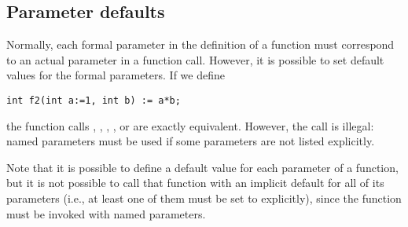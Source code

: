 \subsection{Parameter defaults}

Normally, each formal parameter in the definition of a function must
correspond to an actual parameter in a function call.
However, it is possible to set default values for the formal parameters.
If we define
\begin{lstlisting}
int f2(int a:=1, int b) := a*b;
\end{lstlisting}
the function calls , ,
, , or  are
exactly equivalent.
However, the call  is illegal: named
parameters must be used if some parameters are not listed explicitly.

Note that it is possible to define a default value for each parameter
of a function, but it is not possible to call that function with an
implicit default for all of its parameters
(i.e., at least one of them must be set to  explicitly),
since the function must be invoked with named parameters.

\begin{comment}
\subsection{A parallelizable \Code{for} statement}

The \Code{for} statement is a natural candidate for parallelization.
Indeed, {\smart} can recognize parallelism and perform
the concurrent computation of all the values specified in a \Code{for}
statement, provided no dependencies from one ``iteration'' to the next exist,

For example, the 100 values
\begin{lstlisting}
for (int i in {0..9}, int j in {0..9}) {
  int measure[i][j] := mymodel(i,j);
}
\end{lstlisting}
can be computed concurrently,
This reduces the total execution time in cases where the solution of
\Code{mymodel}
requires substantial computation, and multiple processors are available.
Such situations are common in parametric modeling studies.
\end{comment}

